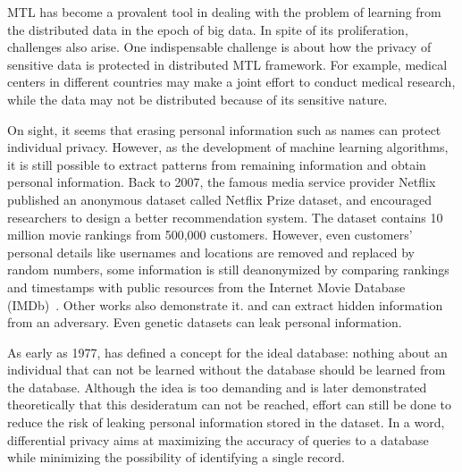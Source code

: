 
MTL has become a provalent tool in dealing with the problem of learning from the distributed data in the epoch of big data. In spite of its proliferation, challenges also arise. One indispensable challenge is about how the privacy of sensitive data is protected in distributed MTL framework. For example, medical centers in different countries may make a joint effort to conduct medical research, while the data may not be distributed because of its sensitive nature.

On sight, it seems that erasing personal information such as names can protect individual privacy. However, as the development of machine learning algorithms, it is still possible to extract patterns from remaining information and obtain personal information. Back to 2007, the famous media service provider Netflix published an anonymous dataset called Netflix Prize dataset, and encouraged researchers to design a better recommendation system. The dataset contains 10 million movie rankings from 500,000 customers. However, even customers' personal details like usernames and locations are removed and replaced by random numbers, some information is still deanonymized by comparing rankings and timestamps with public resources from the Internet Movie Database (IMDb)~\cite{4531148}. Other works also demonstrate it. \cite{doi:10.1111/j.1748-720X.1997.tb01885.x} and \cite{DBLP:journals/corr/abs-0803-0032} can extract hidden information from an adversary. Even genetic datasets can leak personal information\cite{10.1371/journal.pgen.1000167,Wang:2009:LYI:1653662.1653726}.


As early as 1977, \cite{dalenius1977towards} has defined a concept for the ideal database: nothing about an individual that can not be learned without the database should be learned from the database. Although the idea is too demanding and is later demonstrated theoretically that this desideratum can not be reached\cite{Dwork06differentialprivacy}, effort can still be done to reduce the risk of leaking personal information stored in the dataset. In a word, differential privacy aims at maximizing the accuracy of queries to a database while minimizing the possibility of identifying a single record.

